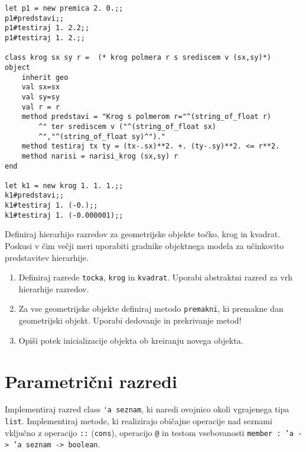 \begin{ex}
\begin{sol}
\begin{lstlisting}
let p1 = new premica 2. 0.;;
p1#predstavi;;
p1#testiraj 1. 2.2;;
p1#testiraj 1. 2.;;

class krog sx sy r =  (* krog polmera r s srediscem v (sx,sy)*)
object
    inherit geo
    val sx=sx
    val sy=sy
    val r = r
    method predstavi = "Krog s polmerom r="^(string_of_float r)
        ^" ter srediscem v ("^(string_of_float sx)
        ^","^(string_of_float sy)^")."
    method testiraj tx ty = (tx-.sx)**2. +. (ty-.sy)**2. <= r**2.
    method narisi = narisi_krog (sx,sy) r
end

let k1 = new krog 1. 1. 1.;;
k1#predstavi;;
k1#testiraj 1. (-0.);;
k1#testiraj 1. (-0.000001);;
\end{lstlisting}

\end{sol}

\end{ex}





\begin{ex}
Definiraj hierarhijo razredov za geometrijske objekte to\v cko, krog in kvadrat. Poskusi v \v cim ve\v cji meri uporabiti gradnike objektnega modela za u\v cinkovito predstavitev hierarhije. 

\begin{enumerate}
\item Definiraj razrede \lstinline{tocka}, \lstinline{krog} in \lstinline{kvadrat}. Uporabi abstraktni razred za vrh hierarhije razredov.

\item Za vse geometrijske objekte definiraj metodo \lstinline{premakni}, ki premakne dan geometrijski objekt. Uporabi dedovanje in prekrivanje metod!

\item Opi\v si potek inicializacije objekta ob kreiranju novega objekta.
\end{enumerate}
\end{ex} 







\section{Parametri\v cni razredi}





\begin{ex}
Implementiraj razred class \lstinline{'a seznam}, ki naredi ovojnico okoli vgrajenega tipa \texttt{list}. Implementiraj metode, ki realizirajo obi\v cajne operacije nad seznami vključno z operacijo \texttt{::} (\texttt{cons}), operacijo \texttt{@} in testom vsebovanosti \texttt{member : 'a -> 'a seznam -> boolean}.
\end{ex}





